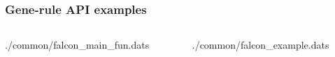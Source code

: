 \documentclass[compress]{beamer}
\newcommand*{\commonDir}{./common/}%
\begin{document}
\begin{frame}[fragile]
\frametitle{Gene-rule API examples}

\begin{columns}
%
\begin{column}{0.5\textwidth}

{\commonDir falcon_main_fun.dats}
\end{column}
%
\vrule{}
%
\begin{column}{0.5\textwidth}

{\commonDir falcon_example.dats}
\end{column}
%
\end{columns}
\end{frame}

\end{document}
